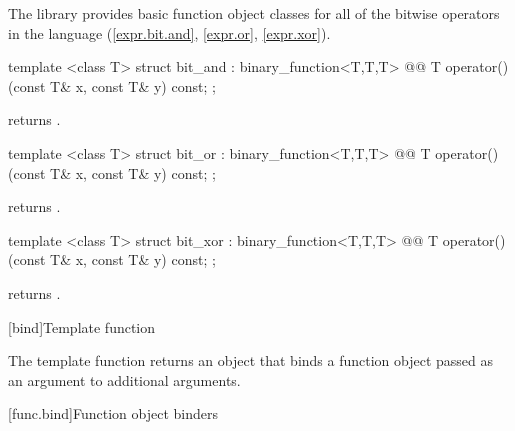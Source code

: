 \documentclass[american,twoside]{book}
\begin{document}
\pnum
The library provides basic function object classes for all of the bitwise
operators in the language (\ref{expr.bit.and}, \ref{expr.or}, \ref{expr.xor}).

%
\begin{itemdecl}
template <class T> struct bit_and : binary_function<T,T,T> {
  @@
    T operator()(const T& x, const T& y) const;
};
\end{itemdecl}

\begin{itemdescr}
\pnum
{} returns .
\end{itemdescr}

%
\begin{itemdecl}
template <class T> struct bit_or : binary_function<T,T,T> {
  @@
    T operator()(const T& x, const T& y) const;
};
\end{itemdecl}

\begin{itemdescr}
\pnum
{} returns .
\end{itemdescr}

%
\begin{itemdecl}
template <class T> struct bit_xor : binary_function<T,T,T> {
  @@
    T operator()(const T& x, const T& y) const;
};
\end{itemdecl}

\begin{itemdescr}
\pnum
{} returns .
\end{itemdescr}

\setcounter{subsection}{9}
[bind]{\marktr{}Template function }

\pnum
The template function  returns an object that binds a
function object passed as an argument to additional arguments.

\pnum
{}

[func.bind]{\marktr{}Function object binders}
\end{document}
